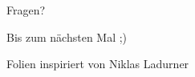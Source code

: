 \documentclass[
  german,            %
  aspectratio=169,    %
]{tumbeamer}
\begin{document}
\begin{frame}[c]{}{}
  \begin{center}
    \LARGE Fragen?
  \end{center}
  \vspace{0.5cm}
  \begin{center}
    \LARGE Bis zum nächsten Mal ;) \\
  \end{center}
  \vspace{1.0cm}
  \begin{center}
    \small Folien inspiriert von Niklas Ladurner
  \end{center}
\end{frame}
\end{document}
